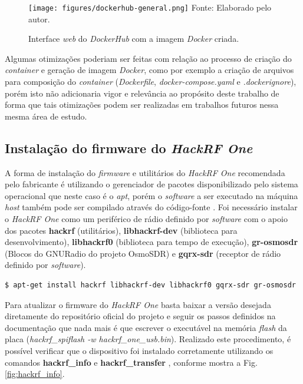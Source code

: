 \documentclass[
  12pt,				%
  openright,			%
  twoside,			%
  a4paper,			%
  english,			%
  french,				%
  spanish,			%
  brazil,				%
  ]{abntex2}
\begin{document}
\begin{figure}[!htb]
  \centering
  \caption{Interface \textit{web} do \textit{DockerHub} com a imagem \textit{Docker} criada.}
  \texttt{[image: figures/dockerhub-general.png]}
  Fonte: Elaborado pelo autor.
  \label{fig:dockerhub-general}
\end{figure}

Algumas otimizações poderiam ser feitas com relação ao processo de criação do \textit{container} e geração de imagem \textit{Docker}, como por exemplo a criação
de arquivos para composição do \textit{container} (\textit{Dockerfile}, \textit{docker-compose.yaml} e \textit{.dockerignore}), porém isto
não adicionaria vigor e relevância ao propósito deste trabalho de forma que tais otimizações podem ser realizadas em trabalhos futuros nessa mesma
área de estudo.

\subsection*{Instalação do firmware do \textit{HackRF One}}

A forma de instalação do \textit{firmware} e utilitários do \textit{HackRF One} recomendada pelo fabricante é utilizando o gerenciador de pacotes disponibilizado pelo
sistema operacional que neste caso é o \textit{apt}, porém o \textit{software} a ser executado na máquina \textit{host} também pode ser compilado através do código-fonte \cite{HACKRF-build-host-software}. Foi necessário instalar o \textit{HackRF One} como um periférico de rádio definido por \textit{software} com o
apoio dos pacotes \textbf{hackrf} (utilitários), \textbf{libhackrf-dev} (biblioteca para desenvolvimento), \textbf{libhackrf0} (biblioteca para tempo de execução),
\textbf{gr-osmosdr} (Blocos do GNURadio do projeto OsmoSDR) e \textbf{gqrx-sdr} (receptor de rádio definido por \textit{software}).

\begin{adjustbox}{max width=\linewidth}
  \begin{lstlisting}[language=bash]
  $ apt-get install hackrf libhackrf-dev libhackrf0 gqrx-sdr gr-osmosdr
\end{lstlisting}
\end{adjustbox}

Para atualizar o firmware do \textit{HackRF One} basta baixar a versão desejada diretamente do repositório oficial do projeto e seguir os passos
definidos na documentação \cite{HACKRF-updating-firmware} que nada mais é que escrever o executável na memória \textit{flash} da placa (\textit{hackrf\_spiflash -w hackrf\_one\_usb.bin}).
Realizado este procedimento, é possível verificar que o dispositivo foi instalado corretamente utilizando os comandos \textbf{hackrf\_info} e \textbf{hackrf\_transfer} \cite{HACKRF-tools}, conforme mostra a Fig. \ref{fig:hackrf_info}.
\end{document}
